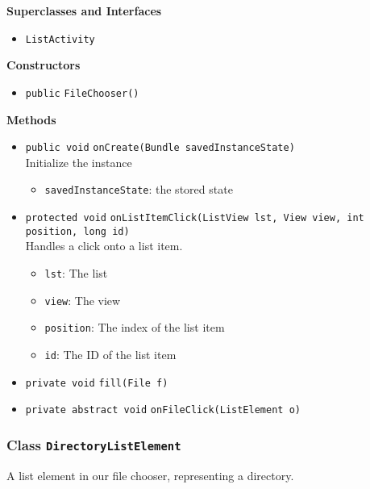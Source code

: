 \textbf{Superclasses and Interfaces}
\begin{itemize}
\item \lstinline|ListActivity|
\end{itemize}



\textbf{Constructors}
\begin{itemize}
\item \lstinline|public| \lstinline|FileChooser|\lstinline|()|




\end{itemize}


\textbf{Methods}
\begin{itemize}
\item \lstinline|public void| \lstinline|onCreate|\lstinline|(Bundle savedInstanceState)|\\
Initialize the instance
\begin{itemize}
\item \lstinline|savedInstanceState|: the stored state
\end{itemize}



\item \lstinline|protected void| \lstinline|onListItemClick|\lstinline|(ListView lst, View view, int position, long id)|\\
Handles a click onto a list item.
\begin{itemize}
\item \lstinline|lst|: The list
\item \lstinline|view|: The view
\item \lstinline|position|: The index of the list item
\item \lstinline|id|: The ID of the list item
\end{itemize}



\item \lstinline|private void| \lstinline|fill|\lstinline|(File f)|




\item \lstinline|private abstract void| \lstinline|onFileClick|\lstinline|(ListElement o)|




\end{itemize}

\subsubsection{Class \lstinline|DirectoryListElement|}
A list element in our file chooser, representing a directory. \\


